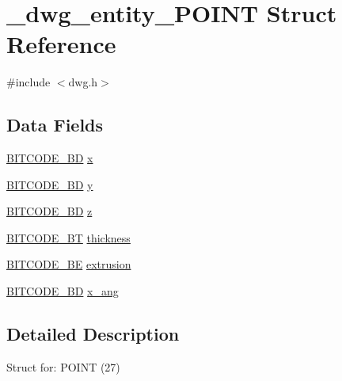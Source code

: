 \hypertarget{struct__dwg__entity__POINT}{\section{\-\_\-dwg\-\_\-entity\-\_\-\-P\-O\-I\-N\-T \-Struct \-Reference}
\label{struct__dwg__entity__POINT}
}


{\ttfamily \#include $<$dwg.\-h$>$}

\subsection*{\-Data \-Fields}
\begin{DoxyCompactItemize}
\item 
\hyperlink{dwg_8h_a3c1e6781466b74ba07785d57da70ed97}{\-B\-I\-T\-C\-O\-D\-E\-\_\-\-B\-D} \hyperlink{struct__dwg__entity__POINT_a0616418bf0f5afd7f6f658b187eb24c1}{x}
\item 
\hyperlink{dwg_8h_a3c1e6781466b74ba07785d57da70ed97}{\-B\-I\-T\-C\-O\-D\-E\-\_\-\-B\-D} \hyperlink{struct__dwg__entity__POINT_a372a513258a3f3b6613573af0b572875}{y}
\item 
\hyperlink{dwg_8h_a3c1e6781466b74ba07785d57da70ed97}{\-B\-I\-T\-C\-O\-D\-E\-\_\-\-B\-D} \hyperlink{struct__dwg__entity__POINT_ad77dd3b3c0eeb97dd830e61b04b4dd38}{z}
\item 
\hyperlink{dwg_8h_afc93a5ddc38aeff965d4e93c71514495}{\-B\-I\-T\-C\-O\-D\-E\-\_\-\-B\-T} \hyperlink{struct__dwg__entity__POINT_afeeeeb4864546fbcfb61ffa8d58ebbb0}{thickness}
\item 
\hyperlink{dwg_8h_ac2622137c01aa3a719ec6c571d06ee6a}{\-B\-I\-T\-C\-O\-D\-E\-\_\-\-B\-E} \hyperlink{struct__dwg__entity__POINT_a9f68303dc75e2f4f47cf1e6523085888}{extrusion}
\item 
\hyperlink{dwg_8h_a3c1e6781466b74ba07785d57da70ed97}{\-B\-I\-T\-C\-O\-D\-E\-\_\-\-B\-D} \hyperlink{struct__dwg__entity__POINT_a5cebadb1dcd7064cfc861b6e6e391d9d}{x\-\_\-ang}
\end{DoxyCompactItemize}


\subsection{\-Detailed \-Description}
\-Struct for\-: \-P\-O\-I\-N\-T (27) 

